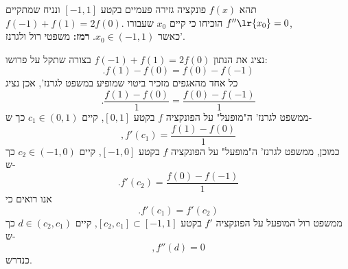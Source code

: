 תהא $f(x)$ פונקציה גזירה פעמיים בקטע \([-1,1]\) ונניח שמתקיים \\
\(f(-1) + f(1) = 2f(0)\). הוכיחו כי קיים \(x_0\) שעבורו \(f''\lr{x_0} = 0\),\\
כאשר \(x_0 \in (-1,1)\). \textbf{רמז:} משפטי רול ולגרנז'.
\begin{solbox}
נציג את הנתון
$f(-1)+f(1)=2f(0)$
בצורה שתקל על פרושו:
$$.f(1)-f(0)=f(0)-f(-1)$$
כל אחד מהאגפים מזכיר ביטוי שמופיע במשפט לגרנז', אכן נציג
$$.\frac{f(1)-f(0)}{1}=\frac{f(0)-f(-1)}{1}$$
ממשפט לגרנז' ה"מופעל" על הפונקציה
$f$
בקטע
$[0,1]$,
קיים
$c_1\in(0,1)$
כך ש-
$$,f'(c_1)=\frac{f(1)-f(0)}{1}$$
כמוכן,
ממשפט לגרנז' ה"מופעל" על הפונקציה
$f$
בקטע
$[-1,0]$,
קיים
$c_2\in(-1,0)$
כך ש-
$$.f'(c_2)=\frac{f(0)-f(-1)}{1}$$
אנו רואים כי
$$.f'(c_1)=f'(c_2)$$
ממשפט רול המופעל על הפונקציה
$f'$
בקטע
$[c_2,c_1]\subset [-1,1]$,
קיים
$d\in(c_2,c_1)$
כך ש-
$$,f''(d)=0$$
כנדרש.
\end{solbox}
